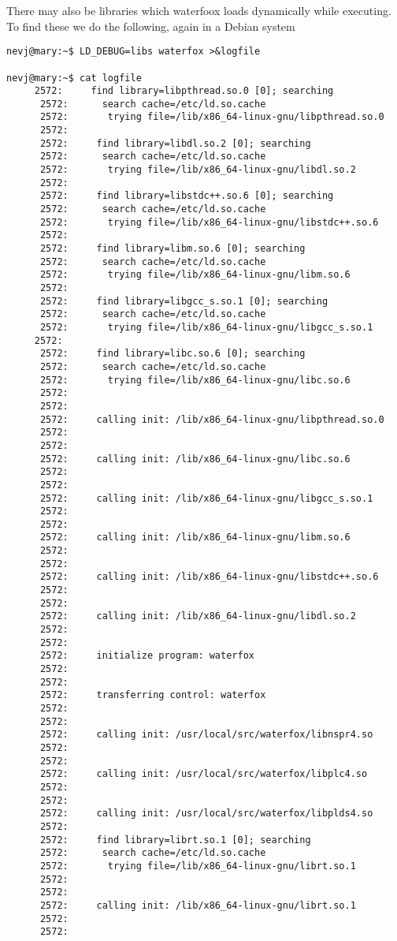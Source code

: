 \documentclass{article}  %
\begin{document}
 There may also be libraries which waterfoox loads dynamically while executing. To find these we do the following, again in a Debian system
\begin{verbatim}
nevj@mary:~$ LD_DEBUG=libs waterfox >&logfile

nevj@mary:~$ cat logfile
     2572:     find library=libpthread.so.0 [0]; searching
      2572:      search cache=/etc/ld.so.cache
      2572:       trying file=/lib/x86_64-linux-gnu/libpthread.so.0
      2572:
      2572:     find library=libdl.so.2 [0]; searching
      2572:      search cache=/etc/ld.so.cache
      2572:       trying file=/lib/x86_64-linux-gnu/libdl.so.2
      2572:
      2572:     find library=libstdc++.so.6 [0]; searching
      2572:      search cache=/etc/ld.so.cache
      2572:       trying file=/lib/x86_64-linux-gnu/libstdc++.so.6
      2572:
      2572:     find library=libm.so.6 [0]; searching
      2572:      search cache=/etc/ld.so.cache
      2572:       trying file=/lib/x86_64-linux-gnu/libm.so.6
      2572:
      2572:     find library=libgcc_s.so.1 [0]; searching
      2572:      search cache=/etc/ld.so.cache
      2572:       trying file=/lib/x86_64-linux-gnu/libgcc_s.so.1
     2572:
      2572:     find library=libc.so.6 [0]; searching
      2572:      search cache=/etc/ld.so.cache
      2572:       trying file=/lib/x86_64-linux-gnu/libc.so.6
      2572:
      2572:
      2572:     calling init: /lib/x86_64-linux-gnu/libpthread.so.0
      2572:
      2572:
      2572:     calling init: /lib/x86_64-linux-gnu/libc.so.6
      2572:
      2572:
      2572:     calling init: /lib/x86_64-linux-gnu/libgcc_s.so.1
      2572:
      2572:
      2572:     calling init: /lib/x86_64-linux-gnu/libm.so.6
      2572:
      2572:
      2572:     calling init: /lib/x86_64-linux-gnu/libstdc++.so.6
      2572:
      2572:
      2572:     calling init: /lib/x86_64-linux-gnu/libdl.so.2
      2572:
      2572:
      2572:     initialize program: waterfox
      2572:
      2572:
      2572:     transferring control: waterfox
      2572:
      2572:
      2572:     calling init: /usr/local/src/waterfox/libnspr4.so
      2572:
      2572:
      2572:     calling init: /usr/local/src/waterfox/libplc4.so
      2572:
      2572:
      2572:     calling init: /usr/local/src/waterfox/libplds4.so
      2572:
      2572:     find library=librt.so.1 [0]; searching
      2572:      search cache=/etc/ld.so.cache
      2572:       trying file=/lib/x86_64-linux-gnu/librt.so.1
      2572:
      2572:
      2572:     calling init: /lib/x86_64-linux-gnu/librt.so.1
      2572:
      2572:

\end{verbatim}
\end{document}
